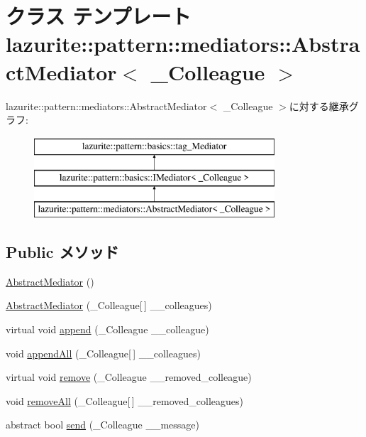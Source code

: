 \hypertarget{classlazurite_1_1pattern_1_1mediators_1_1_abstract_mediator_3_01___colleague_01_4}{
\section{クラス テンプレート lazurite::pattern::mediators::AbstractMediator$<$ \_\-Colleague $>$}
\label{classlazurite_1_1pattern_1_1mediators_1_1_abstract_mediator_3_01___colleague_01_4}
}
lazurite::pattern::mediators::AbstractMediator$<$ \_\-Colleague $>$に対する継承グラフ:\begin{figure}[H]
\begin{center}
\leavevmode
\includegraphics[height=3cm]{classlazurite_1_1pattern_1_1mediators_1_1_abstract_mediator_3_01___colleague_01_4}
\end{center}
\end{figure}
\subsection*{Public メソッド}
\begin{DoxyCompactItemize}
\item 
\hyperlink{classlazurite_1_1pattern_1_1mediators_1_1_abstract_mediator_3_01___colleague_01_4_ae8cad80d36be9ed3613089be9bd3f7d0}{AbstractMediator} ()
\item 
\hyperlink{classlazurite_1_1pattern_1_1mediators_1_1_abstract_mediator_3_01___colleague_01_4_af09ca0cb9331048757088f234f479597}{AbstractMediator} (\_\-Colleague\mbox{[}$\,$\mbox{]} \_\-\_\-colleagues)
\item 
virtual void \hyperlink{classlazurite_1_1pattern_1_1mediators_1_1_abstract_mediator_3_01___colleague_01_4_ad1f32a3e3f783bbb6a5f09de8c991554}{append} (\_\-Colleague \_\-\_\-colleague)
\item 
void \hyperlink{classlazurite_1_1pattern_1_1mediators_1_1_abstract_mediator_3_01___colleague_01_4_ab8c021c05638b19a8a4c6809740d6198}{appendAll} (\_\-Colleague\mbox{[}$\,$\mbox{]} \_\-\_\-colleagues)
\item 
virtual void \hyperlink{classlazurite_1_1pattern_1_1mediators_1_1_abstract_mediator_3_01___colleague_01_4_a601e9d6ee36d72f455ebc9c95e7b0000}{remove} (\_\-Colleague \_\-\_\-removed\_\-colleague)
\item 
void \hyperlink{classlazurite_1_1pattern_1_1mediators_1_1_abstract_mediator_3_01___colleague_01_4_aa15986b46e385754fe1a8fdde417e63c}{removeAll} (\_\-Colleague\mbox{[}$\,$\mbox{]} \_\-\_\-removed\_\-colleagues)
\item 
abstract bool \hyperlink{classlazurite_1_1pattern_1_1mediators_1_1_abstract_mediator_3_01___colleague_01_4_a1b702e3797af6ce233dd4ac910d63282}{send} (\_\-Colleague \_\-\_\-message)
\end{DoxyCompactItemize}
